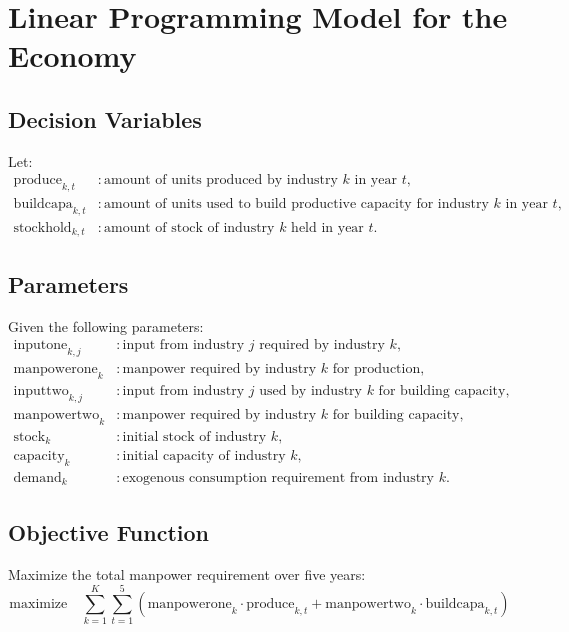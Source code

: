 \documentclass{article}
\begin{document}
\section*{Linear Programming Model for the Economy}

\subsection*{Decision Variables}
Let:
\begin{align*}
\text{produce}_{k, t} & : \text{amount of units produced by industry } k \text{ in year } t, \\
\text{buildcapa}_{k, t} & : \text{amount of units used to build productive capacity for industry } k \text{ in year } t, \\
\text{stockhold}_{k, t} & : \text{amount of stock of industry } k \text{ held in year } t.
\end{align*}

\subsection*{Parameters}
Given the following parameters:
\begin{align*}
\text{inputone}_{k, j} & : \text{input from industry } j \text{ required by industry } k, \\
\text{manpowerone}_{k} & : \text{manpower required by industry } k \text{ for production,} \\
\text{inputtwo}_{k, j} & : \text{input from industry } j \text{ used by industry } k \text{ for building capacity,} \\
\text{manpowertwo}_{k} & : \text{manpower required by industry } k \text{ for building capacity,} \\
\text{stock}_{k} & : \text{initial stock of industry } k, \\
\text{capacity}_{k} & : \text{initial capacity of industry } k, \\
\text{demand}_{k} & : \text{exogenous consumption requirement from industry } k.
\end{align*}

\subsection*{Objective Function}
Maximize the total manpower requirement over five years:
\[
\text{maximize} \quad \sum_{k=1}^{K} \sum_{t=1}^{5} \left( \text{manpowerone}_{k} \cdot \text{produce}_{k, t} + \text{manpowertwo}_{k} \cdot \text{buildcapa}_{k, t} \right)
\]
\end{document}
